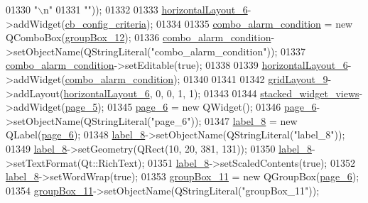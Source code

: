 \begin{DoxyCode}
01330 \textcolor{stringliteral}{"\(\backslash\)n"}
01331 \textcolor{stringliteral}{""}));
01332 
01333         \hyperlink{a00080_a1351e317cba7ca711b6b4d2212b6bf36}{horizontalLayout\_6}->addWidget(\hyperlink{a00080_a89574c631636929702a5928b2a159892}{cb\_config\_criteria});
01334 
01335         \hyperlink{a00080_a2af463e4a88fddd219f2e41a386fbd68}{combo\_alarm\_condition} = \textcolor{keyword}{new} QComboBox(\hyperlink{a00080_af55cd87dbe0f7d42980b1012f15cae2d}{groupBox\_12});
01336         \hyperlink{a00080_a2af463e4a88fddd219f2e41a386fbd68}{combo\_alarm\_condition}->setObjectName(QStringLiteral(\textcolor{stringliteral}{"combo\_alarm\_condition"}));
01337         \hyperlink{a00080_a2af463e4a88fddd219f2e41a386fbd68}{combo\_alarm\_condition}->setEditable(\textcolor{keyword}{true});
01338 
01339         \hyperlink{a00080_a1351e317cba7ca711b6b4d2212b6bf36}{horizontalLayout\_6}->addWidget(\hyperlink{a00080_a2af463e4a88fddd219f2e41a386fbd68}{combo\_alarm\_condition});
01340 
01341 
01342         \hyperlink{a00080_aa03590dd5aac614bf717649a544c015f}{gridLayout\_9}->addLayout(\hyperlink{a00080_a1351e317cba7ca711b6b4d2212b6bf36}{horizontalLayout\_6}, 0, 0, 1, 1);
01343 
01344         \hyperlink{a00080_a59e39bd3d716004e840a5be5dda18b96}{stacked\_widget\_views}->addWidget(\hyperlink{a00080_a421261d29369be60b551aabe8b097597}{page\_5});
01345         \hyperlink{a00080_a48c3dca01f963265cd2ffca998842e05}{page\_6} = \textcolor{keyword}{new} QWidget();
01346         \hyperlink{a00080_a48c3dca01f963265cd2ffca998842e05}{page\_6}->setObjectName(QStringLiteral(\textcolor{stringliteral}{"page\_6"}));
01347         \hyperlink{a00080_af183bfbfb9f38bbdd60caf92b15e23dc}{label\_8} = \textcolor{keyword}{new} QLabel(\hyperlink{a00080_a48c3dca01f963265cd2ffca998842e05}{page\_6});
01348         \hyperlink{a00080_af183bfbfb9f38bbdd60caf92b15e23dc}{label\_8}->setObjectName(QStringLiteral(\textcolor{stringliteral}{"label\_8"}));
01349         \hyperlink{a00080_af183bfbfb9f38bbdd60caf92b15e23dc}{label\_8}->setGeometry(QRect(10, 20, 381, 131));
01350         \hyperlink{a00080_af183bfbfb9f38bbdd60caf92b15e23dc}{label\_8}->setTextFormat(Qt::RichText);
01351         \hyperlink{a00080_af183bfbfb9f38bbdd60caf92b15e23dc}{label\_8}->setScaledContents(\textcolor{keyword}{true});
01352         \hyperlink{a00080_af183bfbfb9f38bbdd60caf92b15e23dc}{label\_8}->setWordWrap(\textcolor{keyword}{true});
01353         \hyperlink{a00080_a417cb0342ea95d3fe5f7e3f4feeb6515}{groupBox\_11} = \textcolor{keyword}{new} QGroupBox(\hyperlink{a00080_a48c3dca01f963265cd2ffca998842e05}{page\_6});
01354         \hyperlink{a00080_a417cb0342ea95d3fe5f7e3f4feeb6515}{groupBox\_11}->setObjectName(QStringLiteral(\textcolor{stringliteral}{"groupBox\_11"}));

\end{DoxyCode}
